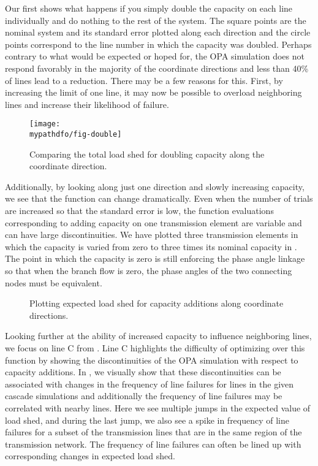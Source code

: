 Our first  shows what happens if you simply double the capacity on each line individually and do nothing to the rest of the system.  The square points are the nominal system and its standard error plotted along each direction and the circle points correspond to the line number in which the capacity was doubled. Perhaps contrary to what would be expected or hoped for, the OPA simulation does not respond favorably in the majority of the coordinate directions and less than 40\% of lines lead to a reduction.  There may be a few reasons for this.  First, by increasing the limit of one line, it may now be possible to overload neighboring lines and increase their likelihood of failure. 

\begin{figure}
\centering
\texttt{[image: \\mypathdfo/fig-double]}
\caption{Comparing the total load shed for doubling capacity along the coordinate direction.}
\label{fig:double}
\end{figure}

Additionally, by looking along just one direction and slowly increasing capacity, we see that the function can change dramatically.  Even when the number of trials are increased so that the standard error is low, the function evaluations corresponding to adding capacity on one transmission element are variable and can have large discontinuities.  We have plotted three transmission elements in which the capacity is varied from zero to three times its nominal capacity in .  The point in which the capacity is zero is still enforcing the phase angle linkage so that when the branch flow is zero, the phase angles of the two connecting nodes must be equivalent.


\begin{figure}

	\caption{Plotting expected load shed for capacity additions along coordinate directions.  }
\label{fig:capadd}
\end{figure}

Looking further at the ability of increased capacity to influence neighboring lines, we focus on line C from .  Line C highlights the difficulty of optimizing over this function by showing the discontinuities of the OPA simulation with respect to capacity additions.  In , we visually show that these discontinuities can be associated with changes in the frequency of line failures for lines in the given cascade simulations and additionally the frequency of line failures may be correlated with nearby lines.  Here we see multiple jumps in the expected value of load shed, and during the last jump, we also see a spike in frequency of line failures for a subset of the transmission lines that are in the same region of the transmission network.  The frequency of line failures can often be lined up with corresponding changes in expected load shed.

